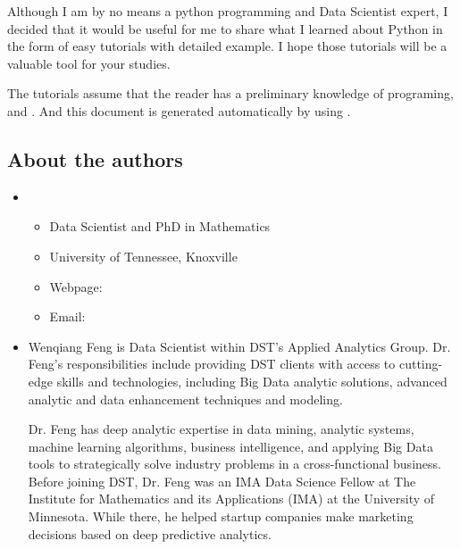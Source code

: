 \documentclass[letterpaper,12pt,english]{sphinxmanual}
\begin{document}
Although I am by no means a python programming and Data Scientist expert,
I decided that it would be useful for me to share what I learned
about Python in the form of easy tutorials with detailed example.
I hope those tutorials will be a valuable tool for your studies.

The tutorials assume that the reader has a preliminary knowledge of  programing,  and . And this document is generated automatically by using .


\subsection{About the authors}
\label{\detokenize{preface:about-the-authors}}\begin{itemize}
\item {} 
\begin{itemize}
\item {} 
Data Scientist and PhD in Mathematics

\item {} 
University of Tennessee, Knoxville

\item {} 
Webpage: 

\item {} 
Email: 

\end{itemize}

\item {} 

Wenqiang Feng is Data Scientist within DST’s Applied Analytics Group. Dr. Feng’s responsibilities include providing DST clients with access to cutting-edge skills and technologies, including Big Data analytic solutions, advanced analytic and data enhancement techniques and modeling.

Dr. Feng has deep analytic expertise in data mining, analytic systems, machine learning algorithms, business intelligence, and applying Big Data tools to strategically solve industry problems in a cross-functional business. Before joining DST, Dr. Feng was an IMA Data Science Fellow at The Institute for Mathematics and its Applications (IMA) at the University of Minnesota. While there, he helped startup companies make marketing decisions based on deep predictive analytics.


\end{itemize}
\end{document}
